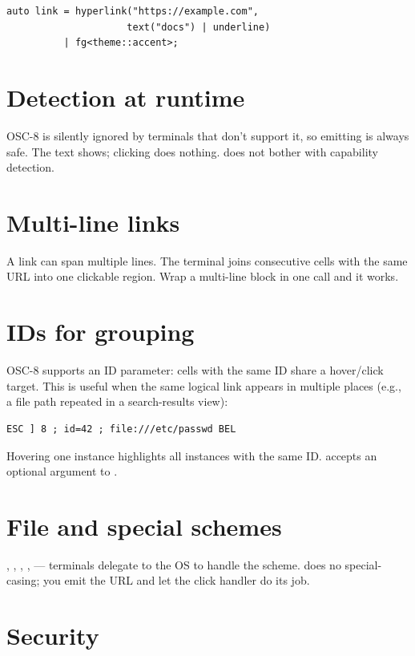 \begin{lstlisting}
auto link = hyperlink("https://example.com",
                     text("docs") | underline)
          | fg<theme::accent>;
\end{lstlisting}

\section{Detection at runtime}

OSC-8 is silently ignored by terminals that don't support it,
so emitting is always safe. The text shows; clicking does
nothing. \maya{} does not bother with capability detection.

\section{Multi-line links}

A link can span multiple lines. The terminal joins consecutive
cells with the same URL into one clickable region. Wrap a
multi-line block in one  call and it works.

\section{IDs for grouping}

OSC-8 supports an ID parameter: cells with the same ID share a
hover/click target. This is useful when the same logical link
appears in multiple places (e.g., a file path repeated in a
search-results view):

\begin{lstlisting}
ESC ] 8 ; id=42 ; file:///etc/passwd BEL
\end{lstlisting}

Hovering one instance highlights all instances with the same
ID. \maya{} accepts an optional  argument to
.

\section{File and special schemes}

, , , ,
 --- terminals delegate to the OS to handle the
scheme. \maya{} does no special-casing; you emit the URL and
let the click handler do its job.

\section{Security}

